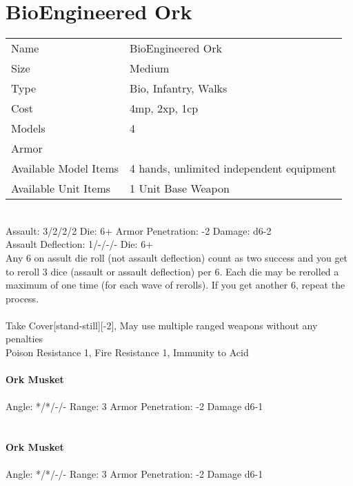 \pagebreak

\section{ BioEngineered Ork }

\begin{tabular}{ll}
  Name & BioEngineered Ork \\
  Size & Medium\\
  Type & Bio, Infantry, Walks\\
  Cost & 4mp, 2xp, 1cp\\
  Models & 4\\
  Armor & \\
  Available Model Items & 4 hands, unlimited independent equipment \\
  Available Unit Items & 1 Unit Base Weapon \\
\end{tabular}

\ \\
Assault: 3/2/2/2 Die: 6+ Armor Penetration: -2 Damage: d6-2 \\
Assault Deflection: 1/-/-/- Die: 6+\\
\indent Any 6 on assult die roll (not assault deflection) count as two success and you get to reroll 3 dice (assault or assault deflection) per 6. Each die may be rerolled a maximum of one time (for each wave of rerolls). If you get another 6, repeat the process.  \\
\ \\
Take Cover[stand-still][-2], May use multiple ranged weapons without any penalties\\ Poison Resistance 1, Fire Resistance 1, Immunity to Acid
\ \\
\ \\
{\bf Ork Musket } \\
\ \\
Angle: */*/-/- Range: 3 Armor Penetration: -2 Damage d6-1 \\
\indent  \\



\ \\
{\bf Ork Musket } \\
\ \\
Angle: */*/-/- Range: 3 Armor Penetration: -2 Damage d6-1 \\
\indent  \\





